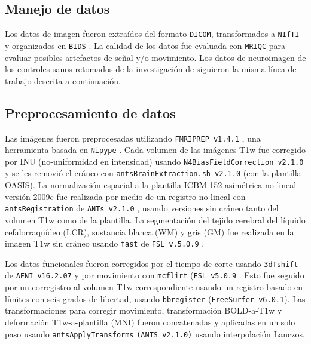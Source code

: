 \subsection{Manejo de datos}
Los datos de imagen fueron extraídos del formato \texttt{DICOM}, transformados a \texttt{NIfTI} y organizados en \texttt{BIDS} \parencite{Gorgolewski2016}.
La calidad de los datos fue evaluada con \texttt{MRIQC} \parencite{Esteban2017} para evaluar posibles artefactos de señal y/o movimiento. Los datos de neuroimagen de los controles sanos retomados de la investigación de \parencite{Garza2017} siguieron la misma línea de trabajo descrita a continuación.\par

\subsection{Preprocesamiento de datos}
Las imágenes fueron preprocesadas utilizando \texttt{FMRIPREP v1.4.1} \parencite{Esteban2019}, una herramienta basada en \texttt{Nipype} \parencite{Gorgolewski2011}.
Cada volumen de las imágenes T1w fue corregido por INU (no-uniformidad en intensidad) usando \texttt{N4BiasFieldCorrection v2.1.0} \parencite{Tustison2010} y se les removió el cráneo con \texttt{antsBrainExtraction.sh v2.1.0} (con la plantilla OASIS).
La normalización espacial a la plantilla ICBM 152 asimétrica no-lineal versión 2009c \parencite{Fonov2009} fue realizada por medio de un registro no-lineal con \texttt{antsRegistration} de \texttt{ANTs v2.1.0} \parencite{Avants2008}, usando versiones sin cráneo tanto del volumen T1w como de la plantilla.
La segmentación del tejido cerebral del líquido cefalorraquídeo (LCR), sustancia blanca (WM) y gris (GM) fue realizada en la imagen T1w sin cráneo usando \texttt{fast} de \texttt{FSL v.5.0.9} \parencite{Zhang2001}.\par
Los datos funcionales fueron corregidos por el tiempo de corte usando \texttt{3dTshift} de \texttt{AFNI v16.2.07} \parencite{Cox1996} y por movimiento con \texttt{mcflirt} (\texttt{FSL v5.0.9} \parencite{Jenkinson2002}.
Esto fue seguido por un corregistro al volumen T1w correspondiente usando un registro basado-en-límites \parencite{Greve2009} con seis grados de libertad, usando \texttt{bbregister} (\texttt{FreeSurfer v6.0.1}).
Las transformaciones para corregir movimiento, transformación BOLD-a-T1w y deformación T1w-a-plantilla (MNI) fueron concatenadas y aplicadas en un solo paso usando \texttt{antsApplyTransforms} \texttt{(ANTS v2.1.0)} usando interpolación Lanczos.\par
